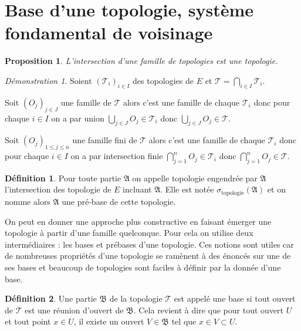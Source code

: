 \documentclass[a4paper, 11pt, french]{book}
\newenvironment{itemise}{\itemize}{\enditemize}
\theoremstyle{plain} %
\newtheorem{proposition}{Proposition}
\theoremstyle{definition} %
\newtheorem{definition}{Définition}
\theoremstyle{remark} %
\newtheorem*{demonstration}{Démonstration}
\newcommand{\1}{\mathds{1}}
\renewcommand{\frak}[1]{\mathfrak{#1}}
\newcommand{\scr}[1]{\mathscr{#1}}
\newcommand{\rm}[1]{\mathrm{#1}}
\begin{document}
\section{Base d'une topologie, système fondamental de voisinage}

\begin{proposition}
	L'intersection d'une famille de topologies est une topologie.
\end{proposition}

\begin{demonstration}
	Soient $(\scr{T}_i)_{i\in I}$ des topologies de $E$ et $\scr{T}=\bigcap_{i\in I}\scr{T}_i$.
	\begin{itemise}
		\item Soit $(O_j)_{j\in J}$ une famille de $\scr{T}$ alors c'est une famille de chaque $\scr{T}_i$ donc pour chaque $i\in I$ on a par union $\bigcup_{j\in J}O_j\in\scr{T}_i$ donc $\bigcup_{j\in J}O_j\in\scr{T}$.
		\item Soit $(O_j)_{1\leqslant j\leqslant n}$ une famille fini de $\scr{T}$ alors c'est une famille de chaque $\scr{T}_i$ donc pour chaque $i\in I$ on a par intersection finie $\bigcap_{j=1}^nO_j\in\scr{T}_i$ donc $\bigcap_{j=1}^nO_j\in\scr{T}$.
	\end{itemise}
\end{demonstration}

\begin{definition}
	Pour toute partie $\frak{A}$ on appelle topologie engendrée par $\frak{A}$ l'intersection des topologie de $E$ incluant $\frak{A}$.
	Elle est notée $\sigma_\rm{topologie}(\frak{A})$ et on nomme alors $\frak{A}$ une pré-base de cette topologie.
\end{definition}

On peut en donner une approche plus constructive en faisant émerger une topologie à partir d'une famille quelconque.
Pour cela on utilise deux intermédiaires : les bases et prébases d'une topologie.
Ces notions sont utiles car de nombreuses propriétés d'une topologie se ramènent à des énoncés sur une de ses bases et beaucoup de topologies sont faciles à définir par la donnée d'une base. 

\begin{definition}
	Une partie $\frak{B}$ de la topologie $\scr{T}$ est appelé une base si tout ouvert de $\scr{T}$ est une réunion d'ouvert de $\frak{B}$.
	Cela revient à dire que pour tout ouvert $U$ et tout point $x\in U$, il existe un ouvert $V\in\frak{B}$ tel que $x\in V\subset U$.
\end{definition}
\end{document}
